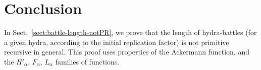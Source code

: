 \section{Conclusion}

In Sect.~\vref{sect:battle-length-notPR}, we prove that the length of hydra-battles (for a given hydra, according to the initial replication factor) is not primitive recursive in general. 
This proof uses properties of the Ackermann function, and the $H'_\alpha$, $F_\alpha$, $L_\alpha$ families of functions.


%














